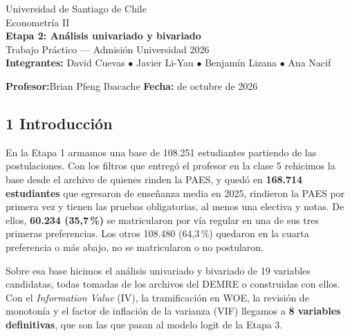 \documentclass[11pt]{article}
\begin{document}
\sloppy

\begin{titlepage}
\centering
\vspace*{3cm}
{\large Universidad de Santiago de Chile}\\[6pt]
{\large Econometría II}\\[2cm]
{\LARGE \textbf{Etapa 2: Análisis univariado y bivariado}}\\[10pt]
{\large Trabajo Práctico --- Admisión Universidad 2026}\\[3cm]

\textbf{Integrantes:}\quad
David Cuevas $\bullet$ Javier Li-Yau $\bullet$ Benjamín Lizana $\bullet$ Ana Nacif

\vspace{0.6cm}

\textbf{Profesor:}\quad Brian Pfeng Ibacache
\qquad
\textbf{Fecha:} de octubre de 2026
\end{titlepage}

\subsection*{1 \; Introducción}

En la Etapa 1 armamos una base de 108.251 estudiantes partiendo de las
postulaciones. Con los filtros que entregó el profesor en la clase 5
rehicimos la base desde el archivo de quienes rinden la PAES, y quedó en
\textbf{168.714 estudiantes} que egresaron de enseñanza media en 2025,
rindieron la PAES por primera vez y tienen las pruebas obligatorias, al
menos una electiva y notas. De ellos, \textbf{60.234 (35,7\,\%)} se
matricularon por vía regular en una de sus tres primeras preferencias. Los
otros 108.480 (64,3\,\%) quedaron en la cuarta preferencia o más abajo, no
se matricularon o no postularon.

Sobre esa base hicimos el análisis univariado y bivariado de 19 variables
candidatas, todas tomadas de los archivos del DEMRE o construidas con
ellos. Con el \textit{Information Value} (IV), la
tramificación en WOE, la revisión de monotonía y el factor de inflación de
la varianza (VIF) llegamos a \textbf{8 variables definitivas}, que son las
que pasan al modelo logit de la Etapa 3.
\end{document}
